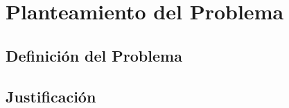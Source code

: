 \section{Planteamiento del Problema}
    \subsection{Definición del Problema}
    \subsection{Justificación}